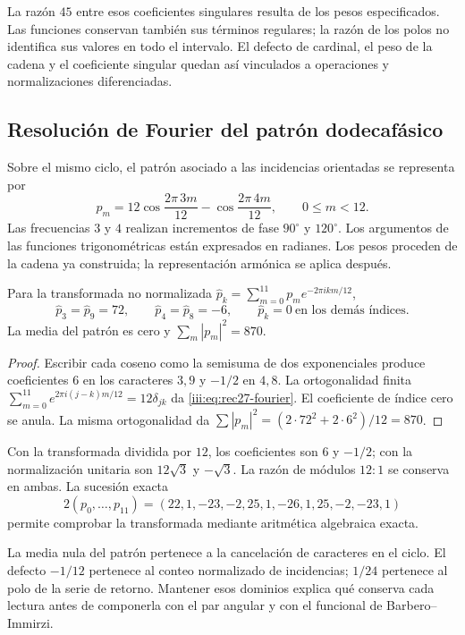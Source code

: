 La razón $45$ entre esos coeficientes singulares resulta de los pesos
especificados. Las funciones conservan también sus términos regulares;
la razón de los polos no identifica sus valores en todo el intervalo.
El defecto de cardinal, el peso de la cadena y el coeficiente singular
quedan así vinculados a operaciones y normalizaciones diferenciadas.

\clearpage
\subsection{Resolución de Fourier del patrón dodecafásico}

Sobre el mismo ciclo, el patrón asociado a las incidencias orientadas se
representa por
\begin{equation}
 p_m=12\cos\frac{2\pi\,3m}{12}
      -\cos\frac{2\pi\,4m}{12},\qquad 0\le m<12.
 \label{iii:eq:rec27-patron}
\end{equation}
Las frecuencias $3$ y $4$ realizan incrementos de fase $90^\circ$ y
$120^\circ$. Los argumentos de las funciones trigonométricas están
expresados en radianes. Los pesos proceden de la cadena ya construida;
la representación armónica se aplica después.

\begin{proposition}
\label{iii:prop:rec27-fourier}
Para la transformada no normalizada
$\widehat p_k=\sum_{m=0}^{11}p_m e^{-2\pi i km/12}$,
\begin{equation}
 \widehat p_3=\widehat p_9=72,\qquad
 \widehat p_4=\widehat p_8=-6,
 \qquad \widehat p_k=0\ \text{en los demás índices}.
 \label{iii:eq:rec27-fourier}
\end{equation}
La media del patrón es cero y
$\sum_m|p_m|^2=870$.
\end{proposition}
\begin{proof}
Escribir cada coseno como la semisuma de dos exponenciales produce
coeficientes $6$ en los caracteres $3,9$ y $-1/2$ en $4,8$.
La ortogonalidad finita
$\sum_{m=0}^{11}e^{2\pi i(j-k)m/12}=12\delta_{jk}$
da \eqref{iii:eq:rec27-fourier}. El coeficiente de índice cero se
anula. La misma ortogonalidad da
$\sum|p_m|^2=(2\cdot72^2+2\cdot6^2)/12=870$.
\end{proof}

Con la transformada dividida por $12$, los coeficientes son $6$ y
$-1/2$; con la normalización unitaria son $12\sqrt3$ y $-\sqrt3$.
La razón de módulos $12:1$ se conserva en ambas. La sucesión exacta
\begin{equation}
 2(p_0,\ldots,p_{11})
 =(22,1,-23,-2,25,1,-26,1,25,-2,-23,1)
 \label{iii:eq:rec27-patron-racional}
\end{equation}
permite comprobar la transformada mediante aritmética algebraica exacta.

La media nula del patrón pertenece a la cancelación de caracteres en el
ciclo. El defecto $-1/12$ pertenece al conteo normalizado de incidencias;
$1/24$ pertenece al polo de la serie de retorno. Mantener esos dominios
explica qué conserva cada lectura antes de componerla con el par angular
y con el funcional de Barbero--Immirzi.
